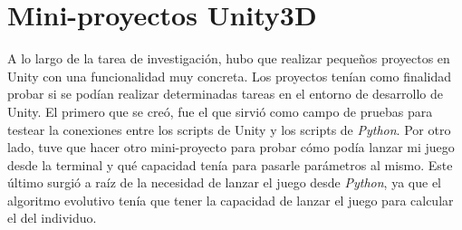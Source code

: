\section{Mini-proyectos Unity3D}

A lo largo de la tarea de investigación, hubo que realizar pequeños proyectos en Unity con una funcionalidad muy concreta. Los proyectos tenían como finalidad probar si se podían realizar determinadas tareas en el entorno de desarrollo de Unity. El primero que se creó, fue el que sirvió como campo de pruebas para testear la conexiones entre los scripts de Unity y los scripts de \emph{Python}. Por otro lado, tuve que hacer otro mini-proyecto para probar cómo podía lanzar mi juego desde la terminal y qué capacidad tenía para pasarle parámetros al mismo. Este último surgió a raíz de la necesidad de lanzar el juego desde \emph{Python}, ya que el algoritmo evolutivo tenía que tener la capacidad de lanzar el juego para calcular el  del individuo.